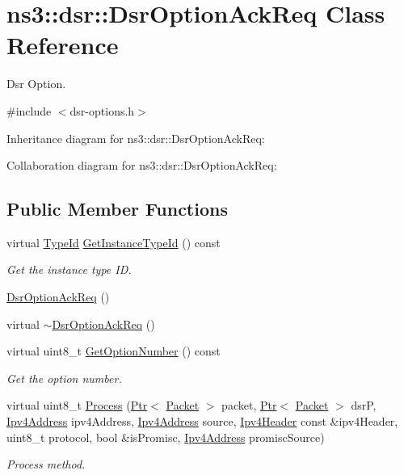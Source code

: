 \hypertarget{classns3_1_1dsr_1_1DsrOptionAckReq}{}\section{ns3\+:\+:dsr\+:\+:Dsr\+Option\+Ack\+Req Class Reference}
\label{classns3_1_1dsr_1_1DsrOptionAckReq}


Dsr Option.  




{\ttfamily \#include $<$dsr-\/options.\+h$>$}



Inheritance diagram for ns3\+:\+:dsr\+:\+:Dsr\+Option\+Ack\+Req\+:


Collaboration diagram for ns3\+:\+:dsr\+:\+:Dsr\+Option\+Ack\+Req\+:
\subsection*{Public Member Functions}
\begin{DoxyCompactItemize}
\item 
virtual \hyperlink{classns3_1_1TypeId}{Type\+Id} \hyperlink{classns3_1_1dsr_1_1DsrOptionAckReq_ad330d4fee1f667a1d963a5407913c580}{Get\+Instance\+Type\+Id} () const 
\begin{DoxyCompactList}\small\item\em Get the instance type ID. \end{DoxyCompactList}\item 
\hyperlink{classns3_1_1dsr_1_1DsrOptionAckReq_a52f658cc088b2253ef6bddc13948456e}{Dsr\+Option\+Ack\+Req} ()
\item 
virtual \hyperlink{classns3_1_1dsr_1_1DsrOptionAckReq_a08245dc9980db8f24dbf40288096723d}{$\sim$\+Dsr\+Option\+Ack\+Req} ()
\item 
virtual uint8\+\_\+t \hyperlink{classns3_1_1dsr_1_1DsrOptionAckReq_ad91c426cac86457e3550789bbef44ed6}{Get\+Option\+Number} () const 
\begin{DoxyCompactList}\small\item\em Get the option number. \end{DoxyCompactList}\item 
virtual uint8\+\_\+t \hyperlink{classns3_1_1dsr_1_1DsrOptionAckReq_a531ec03bb960fff14d4329ef93f53d49}{Process} (\hyperlink{classns3_1_1Ptr}{Ptr}$<$ \hyperlink{classns3_1_1Packet}{Packet} $>$ packet, \hyperlink{classns3_1_1Ptr}{Ptr}$<$ \hyperlink{classns3_1_1Packet}{Packet} $>$ dsrP, \hyperlink{classns3_1_1Ipv4Address}{Ipv4\+Address} ipv4\+Address, \hyperlink{classns3_1_1Ipv4Address}{Ipv4\+Address} source, \hyperlink{classns3_1_1Ipv4Header}{Ipv4\+Header} const \&ipv4\+Header, uint8\+\_\+t protocol, bool \&is\+Promisc, \hyperlink{classns3_1_1Ipv4Address}{Ipv4\+Address} promisc\+Source)
\begin{DoxyCompactList}\small\item\em Process method. \end{DoxyCompactList}\end{DoxyCompactItemize}
